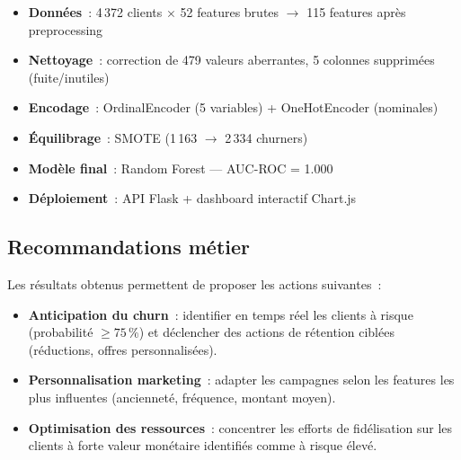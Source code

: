 \documentclass[12pt, a4paper]{article}
\begin{document}
\begin{infobox}
\begin{itemize}
  \item \textbf{Données}~: 4\,372 clients $\times$ 52 features brutes
        $\rightarrow$ 115 features après preprocessing
  \item \textbf{Nettoyage}~: correction de 479 valeurs aberrantes,
        5 colonnes supprimées (fuite/inutiles)
  \item \textbf{Encodage}~: OrdinalEncoder (5 variables) +
        OneHotEncoder (nominales)
  \item \textbf{Équilibrage}~: SMOTE (1\,163 $\rightarrow$ 2\,334 churners)
  \item \textbf{Modèle final}~: Random Forest — AUC-ROC = 1.000
  \item \textbf{Déploiement}~: API Flask + dashboard interactif Chart.js
\end{itemize}
\end{infobox}

\subsection{Recommandations métier}

Les résultats obtenus permettent de proposer les actions suivantes~:

\begin{itemize}
  \item \textbf{Anticipation du churn}~: identifier en temps réel les clients
        à risque (probabilité $\geq 75\,\%$) et déclencher des actions de
        rétention ciblées (réductions, offres personnalisées).
  \item \textbf{Personnalisation marketing}~: adapter les campagnes selon les
        features les plus influentes (ancienneté, fréquence, montant moyen).
  \item \textbf{Optimisation des ressources}~: concentrer les efforts de
        fidélisation sur les clients à forte valeur monétaire identifiés
        comme à risque élevé.
\end{itemize}
\end{document}
